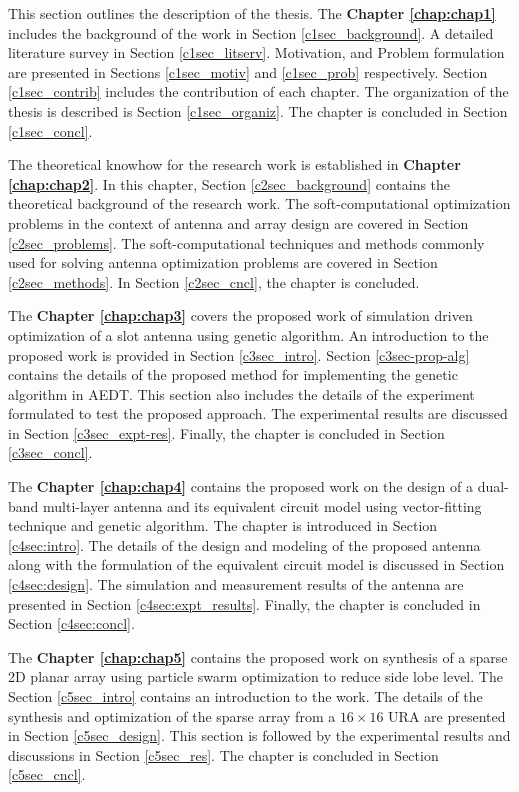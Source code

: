 This section outlines the description of the thesis. The \textbf{Chapter \ref{chap:chap1}} includes the background of the work in Section \ref{c1sec_background}. A detailed literature survey in Section \ref{c1sec_litserv}. Motivation, and Problem formulation are presented in Sections \ref{c1sec_motiv} and \ref{c1sec_prob} respectively. Section \ref{c1sec_contrib} includes the contribution of each chapter. The organization of the thesis is described is Section \ref{c1sec_organiz}. The chapter is concluded in Section \ref{c1sec_concl}.

The theoretical knowhow for the research work is established in \textbf{Chapter \ref{chap:chap2}}. In this chapter, Section \ref{c2sec_background} contains the theoretical background of the research work. The soft-computational optimization problems in the context of antenna and array design are covered in Section \ref{c2sec_problems}. The soft-computational techniques and methods commonly used for solving antenna optimization problems are covered in Section \ref{c2sec_methods}. In Section \ref{c2sec_cncl}, the chapter is concluded.

The \textbf{Chapter \ref{chap:chap3}} covers the proposed work of simulation driven optimization of a slot antenna using genetic algorithm. An introduction to the proposed work is provided in Section \ref{c3sec_intro}. Section \ref{c3sec-prop-alg} contains the details of the proposed method for implementing the genetic algorithm in AEDT. This section also includes the details of the experiment formulated to test the proposed approach. The experimental results are discussed in Section \ref{c3sec_expt-res}. Finally, the chapter is concluded in Section \ref{c3sec_concl}.

The \textbf{Chapter \ref{chap:chap4}} contains the proposed work on the design of a dual-band multi-layer antenna and its equivalent circuit model using vector-fitting technique and genetic algorithm. The chapter is introduced in Section \ref{c4sec:intro}.  The details of the design and modeling of the proposed antenna along with the formulation of the equivalent circuit model is discussed in Section \ref{c4sec:design}. The simulation and measurement results of the antenna are presented in Section \ref{c4sec:expt_results}. Finally, the chapter is concluded in Section \ref{c4sec:concl}.

The \textbf{Chapter \ref{chap:chap5}} contains the proposed work on synthesis of a sparse 2D planar array using particle swarm optimization to reduce side lobe level. The Section \ref{c5sec_intro} contains an introduction to the work. The details of the synthesis and optimization of the sparse array from a $16\times16$ URA are presented in Section \ref{c5sec_design}. This section is followed by the experimental results and discussions in Section \ref{c5sec_res}. The chapter is concluded in Section \ref{c5sec_cncl}.

